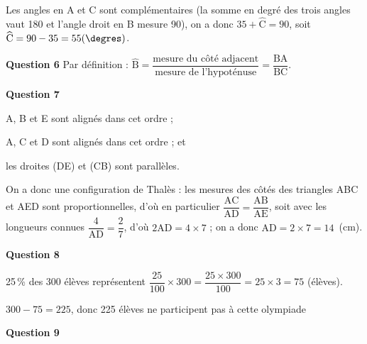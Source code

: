 Les angles en A et C sont complémentaires (la somme en degré des trois angles vaut 180 et l'angle droit en B mesure 90\degres), on a donc $35 + \widehat{\text{C}} = 90$, soit $\widehat{\text{C}} = 90 - 35 = 55(\degres)$.
\medskip

\textbf{Question 6}
Par définition : $\widehat{\text{B}} = \dfrac{\text{mesure du côté adjacent}}{\text{mesure de l'hypoténuse}} = \dfrac{\text{BA}}{\text{BC}}$.

\medskip

\textbf{Question 7}

%
A, B et E sont alignés dans cet ordre ;

A, C et D sont alignés dans cet ordre ; et

les droites (DE) et (CB) sont parallèles.

On a donc une configuration de Thalès : les mesures des côtés des triangles ABC et AED sont proportionnelles, d'où en particulier $\dfrac{\text{AC}}{\text{AD}} = \dfrac{\text{AB}}{\text{AE}}$, soit avec les longueurs connues $\dfrac{4}{\text{AD}} = \dfrac27$, d'où $2\text{AD} = 4 \times 7$ ; on a donc $\text{AD} = 2 \times 7 = 14$~(cm).

\textbf{Question 8}

%
25\,\% des 300 élèves représentent $\dfrac{25}{100} \times 300 = \dfrac{25 \times 300}{100} = 25 \times 3 = 75$ (élèves).

$300 - 75 = 225$, donc 225 élèves ne participent pas à cette olympiade
\medskip


\textbf{Question 9}

